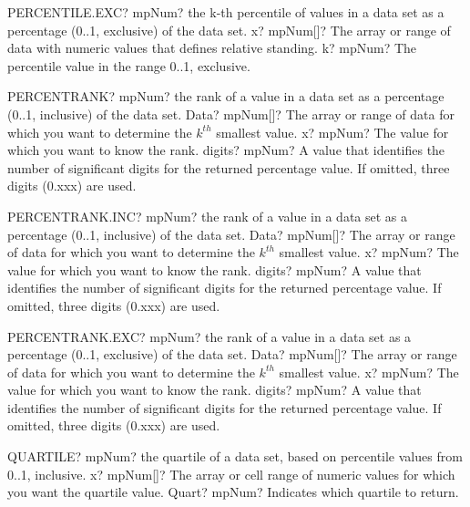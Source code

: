 \documentclass[12pt,a4paper,openany]{book}
\begin{document}
\begin{mpFunctionsExtract}
\mpWorksheetFunctionTwoNotImplemented
{PERCENTILE.EXC? mpNum? the k-th percentile of values  in a data set as a percentage (0..1, exclusive) of the data set.}
{x? mpNum[]?  The array or range of data with numeric values that defines relative standing.}
{k? mpNum? The percentile value in the range 0..1, exclusive.}
\end{mpFunctionsExtract}

\begin{mpFunctionsExtract}
\mpWorksheetFunctionThreeNotImplemented
{PERCENTRANK? mpNum? the rank of a value in a data set as a percentage (0..1, inclusive) of the data set.}
{Data? mpNum[]?  The array or range of data for which you want to determine the $k^{th}$ smallest  value.}
{x? mpNum? The value for which you want to know the rank.}
{digits? mpNum? A value that identifies the number of significant digits for the returned percentage value. If omitted, three digits (0.xxx) are used.}
\end{mpFunctionsExtract}

\begin{mpFunctionsExtract}
\mpWorksheetFunctionThreeNotImplemented
{PERCENTRANK.INC? mpNum? the rank of a value in a data set as a percentage (0..1, inclusive) of the data set.}
{Data? mpNum[]?  The array or range of data for which you want to determine the $k^{th}$ smallest  value.}
{x? mpNum? The value for which you want to know the rank.}
{digits? mpNum? A value that identifies the number of significant digits for the returned percentage value. If omitted, three digits (0.xxx) are used.}
\end{mpFunctionsExtract}

\begin{mpFunctionsExtract}
\mpWorksheetFunctionThreeNotImplemented
{PERCENTRANK.EXC? mpNum? the rank of a value in a data set as a percentage (0..1, exclusive) of the data set.}
{Data? mpNum[]?  The array or range of data for which you want to determine the $k^{th}$ smallest  value.}
{x? mpNum? The value for which you want to know the rank.}
{digits? mpNum? A value that identifies the number of significant digits for the returned percentage value. If omitted, three digits (0.xxx) are used.}
\end{mpFunctionsExtract}

\begin{mpFunctionsExtract}
\mpWorksheetFunctionTwoNotImplemented
{QUARTILE? mpNum? the quartile of a data set, based on percentile values from 0..1, inclusive.}
{x? mpNum[]?  The array or cell range of numeric values for which you want the quartile value.}
{Quart? mpNum? Indicates which quartile to return.}
\end{mpFunctionsExtract}
\end{document}
